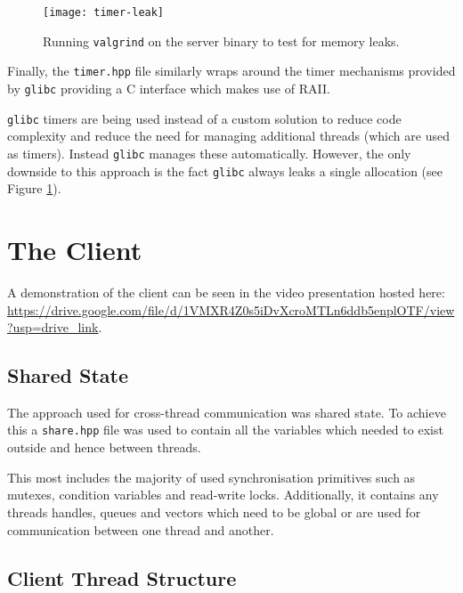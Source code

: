\documentclass[article]{uom-coursework}
\def\CC{{C\nolinebreak\raisebox{.25ex}{\scriptsize\bfseries{++}}}}
\begin{document}
\begin{figure}[H]
\centering
\texttt{[image: timer-leak]}
\caption{Running \texttt{valgrind} on the server binary to test
for memory leaks.}
\label{fig:timerleak}
\end{figure}

Finally, the \texttt{timer.hpp} file similarly wraps around the
timer mechanisms provided by \texttt{glibc} providing a \CC{}
interface which makes use of RAII.

\begin{note}
    \texttt{glibc} timers are being used instead of a custom
    solution to reduce code complexity and reduce the need for
    managing additional threads (which are used as timers).
    Instead \texttt{glibc} manages these automatically. However,
    the only downside to this approach is the fact
    \texttt{glibc} always leaks a single allocation (see Figure
    \ref{fig:timerleak}).
\end{note}

\section{The Client}

\begin{note}
    \raggedright
    A demonstration of the client can be seen in the video
    presentation hosted here:
    \url{https://drive.google.com/file/d/1VMXR4Z0s5iDvXcroMTLn6ddb5enplOTF/view?usp=drive_link}.
\end{note}

\subsection{Shared State}

The approach used for cross-thread communication was shared
state. To achieve this a \texttt{share.hpp} file was used to
contain all the variables which needed to exist outside and
hence between threads.

This most includes the majority of used synchronisation
primitives such as mutexes, condition variables and read-write
locks. Additionally, it contains any threads handles, queues and
vectors which need to be global or are used for communication
between one thread and another.

\subsection{Client Thread Structure}
\end{document}
